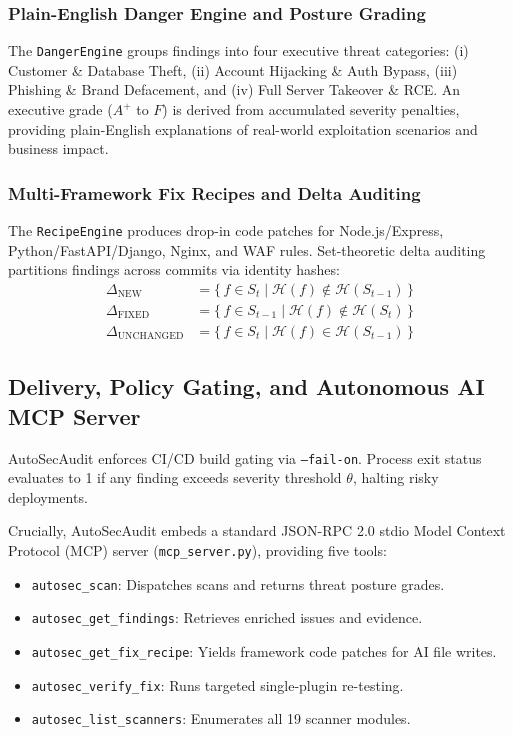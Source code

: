 \documentclass[conference]{IEEEtran}
\begin{document}
\subsubsection{Plain-English Danger Engine and Posture Grading}
The \texttt{DangerEngine} groups findings into four executive threat categories: (i) Customer \& Database Theft, (ii) Account Hijacking \& Auth Bypass, (iii) Phishing \& Brand Defacement, and (iv) Full Server Takeover \& RCE. An executive grade ($A^+$ to $F$) is derived from accumulated severity penalties, providing plain-English explanations of real-world exploitation scenarios and business impact.

\subsubsection{Multi-Framework Fix Recipes and Delta Auditing}
The \texttt{RecipeEngine} produces drop-in code patches for Node.js/Express, Python/FastAPI/Django, Nginx, and WAF rules. Set-theoretic delta auditing partitions findings across commits via identity hashes:
\begin{align}
\Delta_{\text{NEW}} &= \{\, f \in S_t \mid \mathcal{H}(f) \notin \mathcal{H}(S_{t-1}) \,\} \\
\Delta_{\text{FIXED}} &= \{\, f \in S_{t-1} \mid \mathcal{H}(f) \notin \mathcal{H}(S_t) \,\} \\
\Delta_{\text{UNCHANGED}} &= \{\, f \in S_t \mid \mathcal{H}(f) \in \mathcal{H}(S_{t-1}) \,\}
\end{align}

\subsection{Delivery, Policy Gating, and Autonomous AI MCP Server}
AutoSecAudit enforces CI/CD build gating via \texttt{--fail-on}. Process exit status evaluates to 1 if any finding exceeds severity threshold $\theta$, halting risky deployments.

Crucially, AutoSecAudit embeds a standard JSON-RPC 2.0 stdio Model Context Protocol (MCP) server (\texttt{mcp\_server.py}), providing five tools:
\begin{itemize}
    \item \texttt{autosec\_scan}: Dispatches scans and returns threat posture grades.
    \item \texttt{autosec\_get\_findings}: Retrieves enriched issues and evidence.
    \item \texttt{autosec\_get\_fix\_recipe}: Yields framework code patches for AI file writes.
    \item \texttt{autosec\_verify\_fix}: Runs targeted single-plugin re-testing.
    \item \texttt{autosec\_list\_scanners}: Enumerates all 19 scanner modules.
\end{itemize}
\end{document}
